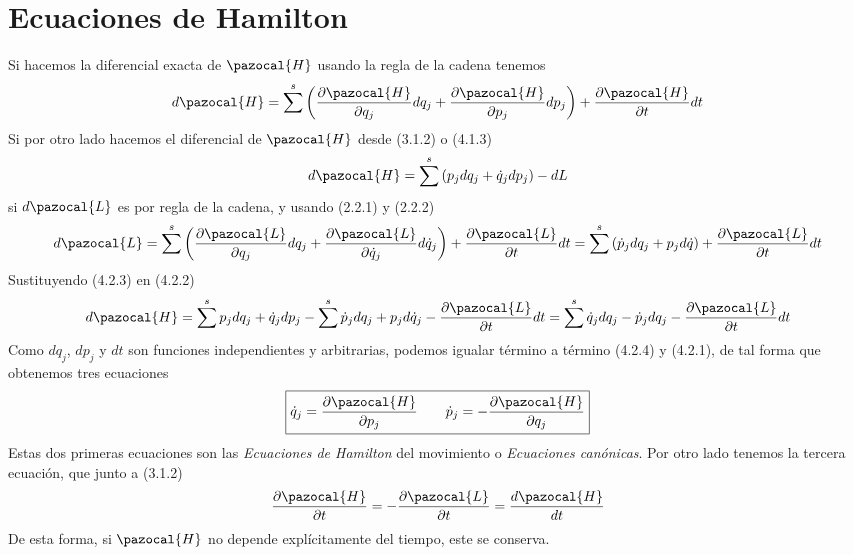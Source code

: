 \section{Ecuaciones de Hamilton} 
Si hacemos la diferencial exacta de $\pazocal{H}$ usando la regla de la cadena tenemos
\begin{equation} \label{4.2.1}
    d\pazocal{H} = \sum^s\left(\frac{\partial \pazocal{H}}{\partial q_j}dq_j+\frac{\partial \pazocal{H}}{\partial p_j}dp_j\right)+\frac{\partial \pazocal{H}}{\partial t} dt
\end{equation} 
Si por otro lado hacemos el diferencial de $\pazocal{H}$ desde (3.1.2) o (4.1.3)
\begin{equation} \label{4.2.2}
    d\pazocal{H} = \sum^s\left(p_j dq_j+\dot{q}_j dp_j\right)-dL
\end{equation} 
si $d\pazocal{L}$ es por regla de la cadena, y usando (2.2.1) y (2.2.2)
\begin{equation} \label{4.2.3}
    d\pazocal{L}= \sum^s\left(\frac{\partial \pazocal{L}}{\partial q_j}dq_j+\frac{\partial \pazocal{L}}{\partial \dot{q}_j}d\dot{q}_j\right) + \frac{\partial \pazocal{L}}{\partial t}dt = \sum^s\left(\dot{p}_j dq_j+p_j d\dot{q}\right) + \frac{\partial \pazocal{L}}{\partial t}dt
\end{equation} 
Sustituyendo (4.2.3) en (4.2.2)
\begin{equation} \label{4.2.4}
    d\pazocal{H} = \sum^s p_j dq_j+\dot{q}_j dp_j-\sum^s \dot{p}_j dq_j+p_j d\dot{q}_j - \frac{\partial \pazocal{L}}{\partial t}dt = \sum^s \dot{q}_j dq_j-\dot{p}_j dq_j - \frac{\partial \pazocal{L}}{\partial t}dt
\end{equation} 
Como $dq_j$, $dp_j$ y $dt$ son funciones independientes y arbitrarias, podemos igualar término a término (4.2.4) y (4.2.1), de tal forma que obtenemos tres ecuaciones
\Large \begin{equation} \label{4.2.5}
    \boxed{\dot{q}_j = \frac{\partial \pazocal{H}}{\partial p_j} \ \ \ \ \ \ \dot{p}_j= -\frac{\partial \pazocal{H}}{\partial q_j}}
\end{equation}  \normalsize
Estas dos primeras ecuaciones son las \textit{Ecuaciones de Hamilton} del movimiento o \textit{Ecuaciones canónicas}. Por otro lado tenemos la tercera ecuación, que junto a (3.1.2)
\begin{equation} \label{4.2.6}
    \frac{\partial \pazocal{H}}{\partial t} = - \frac{\partial \pazocal{L}}{\partial t} = \frac{d \pazocal{H}}{dt}
\end{equation} 
De esta forma, si $\pazocal{H}$ no depende explícitamente del tiempo, este se conserva.

